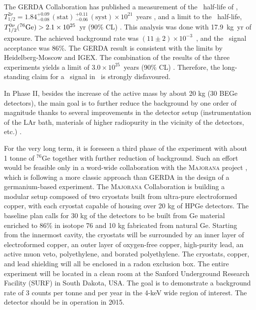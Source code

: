 \documentclass{PoS}
\begin{document}
The GERDA Collaboration has published a measurement of the \bbtnu\ half-life of \GE, $T^{2\nu}_{1/2} = 1.84^{+0.09}_{-0.08}\,(\mathrm{stat})\, ^{+0.11}_{-0.06}\,(\mathrm{syst})\times10^{21}$~years \cite{Agostini:2012nm}, and a limit to the \bbonu\ half-life, $T^{0\nu}_{1/2}(^{76}\mathrm{Ge})>2.1\times10^{25}$~yr (90\% CL) \cite{Agostini:2013mzu}. This analysis was done with 17.9~kg~yr of exposure. The achieved background rate was $(11\pm2)\times10^{-3}$~\ckky,  and the \bbonu\ signal acceptance was 86\%. The GERDA result is consistent with the limits by
Heidelberg-Moscow and IGEX. The combination of the results of the three experiments yields a limit of $3.0\times10^{25}$~years (90\% CL) \cite{Agostini:2013mzu}. Therefore, the long-standing claim for a \bbonu\ signal in \GE\ is strongly disfavoured.

In Phase II, besides the increase of the active mass by about 20 kg (30 BEGe detectors), the main goal is to further reduce the background by one order of magnitude thanks to several improvements in the detector setup (instrumentation of the LAr bath, materials of higher radiopurity in the vicinity of the detectors, etc.) \cite{Macolino:2014vya}. 

For the very long term, it is foreseen a third phase of the experiment with about 1 tonne of $^{76}$Ge together with further reduction of background. Such an effort would be feasible only in a word-wide collaboration with the {\scshape Majorana} project \cite{Abgrall:2013rze}, which is following a more classic approach than GERDA in the design of a germanium-based experiment. The {\scshape Majorana} Collaboration is building a modular setup composed of two cryostats built from ultra-pure electroformed copper, with each cryostat capable of housing over 20 kg of HPGe detectors. The baseline plan calls for 30 kg of the detectors to be built from Ge material enriched to 86\% in isotope 76 and 10 kg fabricated from natural Ge. Starting from the innermost cavity, the cryostats will be surrounded by an inner layer of electroformed copper, an outer layer of oxygen-free copper, high-purity lead, an active muon veto, polyethylene, and borated polyethylene. The cryostats, copper, and lead shielding will all be enclosed in a radon exclusion box. The entire experiment will be located in a clean room at the Sanford Underground Research Facility (SURF) in South Dakota, USA. The goal is to demonstrate a background rate of 3 counts per tonne and per year in the 4-keV wide region of interest. The detector should be in operation in 2015.
\end{document}
